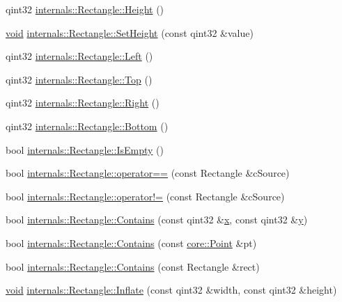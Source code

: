 \begin{DoxyCompactItemize}
\item 
qint32 \hyperlink{group___o_p_map_widget_gaef58ba0ac7584cbe21ca8e4763187ffc}{internals\-::\-Rectangle\-::\-Height} ()
\item 
\hyperlink{group___u_a_v_objects_plugin_ga444cf2ff3f0ecbe028adce838d373f5c}{void} \hyperlink{group___o_p_map_widget_ga88adf48284c51b739196968be6fa880b}{internals\-::\-Rectangle\-::\-Set\-Height} (const qint32 \&value)
\item 
qint32 \hyperlink{group___o_p_map_widget_ga63b6483e8a88de2d85d97e8d97477133}{internals\-::\-Rectangle\-::\-Left} ()
\item 
qint32 \hyperlink{group___o_p_map_widget_gaa6e68777faa43b088a20ae9e33b964dd}{internals\-::\-Rectangle\-::\-Top} ()
\item 
qint32 \hyperlink{group___o_p_map_widget_ga3d473ded37080d218c696415f34d7141}{internals\-::\-Rectangle\-::\-Right} ()
\item 
qint32 \hyperlink{group___o_p_map_widget_ga9c67095a9af32efd25d873638e82a4d6}{internals\-::\-Rectangle\-::\-Bottom} ()
\item 
bool \hyperlink{group___o_p_map_widget_ga62166310290103c5ae2f9fa8f2897108}{internals\-::\-Rectangle\-::\-Is\-Empty} ()
\item 
bool \hyperlink{group___o_p_map_widget_ga7035d0d861ec954d00fbfac5b0294105}{internals\-::\-Rectangle\-::operator==} (const \-Rectangle \&c\-Source)
\item 
bool \hyperlink{group___o_p_map_widget_ga646c7f23cab3711b80ef2a20056acdf0}{internals\-::\-Rectangle\-::operator!=} (const \-Rectangle \&c\-Source)
\item 
bool \hyperlink{group___o_p_map_widget_ga9a50cb554ff687d93a14da4f11d11bd1}{internals\-::\-Rectangle\-::\-Contains} (const qint32 \&\hyperlink{_o_p_plots_8m_a9336ebf25087d91c818ee6e9ec29f8c1}{x}, const qint32 \&\hyperlink{_o_p_plots_8m_a2fb1c5cf58867b5bbc9a1b145a86f3a0}{y})
\item 
bool \hyperlink{group___o_p_map_widget_gae21b00316ef3c6fc871a429a41261624}{internals\-::\-Rectangle\-::\-Contains} (const \hyperlink{structcore_1_1_point}{core\-::\-Point} \&pt)
\item 
bool \hyperlink{group___o_p_map_widget_gaaaaf9a5129b7af2409ad9a9e54698206}{internals\-::\-Rectangle\-::\-Contains} (const \-Rectangle \&rect)
\item 
\hyperlink{group___u_a_v_objects_plugin_ga444cf2ff3f0ecbe028adce838d373f5c}{void} \hyperlink{group___o_p_map_widget_ga75ec4589acf2aef1446a948b34b40cb9}{internals\-::\-Rectangle\-::\-Inflate} (const qint32 \&width, const qint32 \&height)

\end{DoxyCompactItemize}
